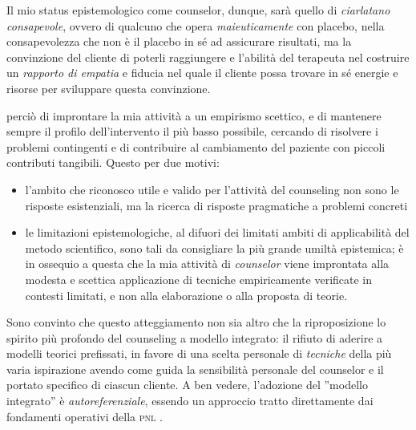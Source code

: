 Il mio status epistemologico come counselor, dunque, sarà quello di \emph{ciarlatano consapevole},  ovvero di qualcuno che opera \emph{maieuticamente} con placebo, nella consapevolezza che non è il placebo in sé ad assicurare risultati, ma la convinzione del cliente di poterli raggiungere e l'abilità del terapeuta nel costruire un \emph{rapporto di empatia}  e fiducia nel quale il cliente possa trovare in sé energie e risorse per sviluppare questa convinzione.

 perciò di improntare la mia attività a un empirismo scettico, e di mantenere sempre il profilo dell'intervento il più basso possibile, cercando di risolvere i problemi contingenti e di contribuire al cambiamento del paziente con piccoli contributi tangibili. Questo per due motivi:

\begin{itemize}
\item l'ambito che riconosco utile e valido per l'attività del counseling non sono le risposte esistenziali, ma la ricerca di risposte pragmatiche a problemi concreti
\item le limitazioni epistemologiche, al difuori dei limitati ambiti di applicabilità del metodo scientifico, sono tali da consigliare la più grande umiltà epistemica; è in ossequio a questa che la mia attività di \emph{counselor} viene improntata alla modesta e scettica applicazione di tecniche empiricamente verificate in contesti limitati, e non alla elaborazione o alla proposta di teorie\cite{fooled}.
\end{itemize}

\noindent Sono convinto che questo atteggiamento non sia altro che la riproposizione lo spirito più profondo del counseling a modello integrato: il rifiuto di aderire a modelli teorici prefissati, in favore di una scelta personale di \textit{tecniche} della più varia ispirazione avendo come guida la sensibilità personale del counselor e il portato specifico di ciascun cliente. A ben vedere, l'adozione del ''modello integrato'' è \textit{autoreferenziale}, essendo un approccio tratto direttamente dai fondamenti operativi della \textsc{pnl}\cite{sleight} \cite{magic}.
